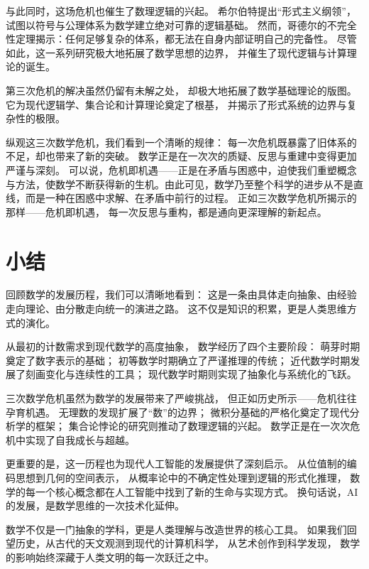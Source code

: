 与此同时，这场危机也催生了数理逻辑的兴起。  
希尔伯特提出“形式主义纲领”，试图以符号与公理体系为数学建立绝对可靠的逻辑基础。  
然而，哥德尔的不完全性定理揭示：任何足够复杂的体系，都无法在自身内部证明自己的完备性。    
尽管如此，这一系列研究极大地拓展了数学思想的边界，  
并催生了现代逻辑与计算理论的诞生。






第三次危机的解决虽然仍留有未解之处，  
却极大地拓展了数学基础理论的版图。  
它为现代逻辑学、集合论和计算理论奠定了根基，  
并揭示了形式系统的边界与复杂性的极限。  







纵观这三次数学危机，我们看到一个清晰的规律：  
每一次危机既暴露了旧体系的不足，却也带来了新的突破。  
数学正是在一次次的质疑、反思与重建中变得更加严谨与深刻。  
可以说，危机即机遇——正是在矛盾与困惑中，迫使我们重塑概念与方法，使数学不断获得新的生机。由此可见，数学乃至整个科学的进步从不是直线，而是一种在困惑中求解、在矛盾中前行的过程。
正如三次数学危机所揭示的那样——危机即机遇，  
每一次反思与重构，都是通向更深理解的新起点。


\section{小结}

回顾数学的发展历程，我们可以清晰地看到：  
这是一条由具体走向抽象、由经验走向理论、由分散走向统一的演进之路。  
这不仅是知识的积累，更是人类思维方式的演化。

从最初的计数需求到现代数学的高度抽象，  
数学经历了四个主要阶段：  
萌芽时期奠定了数字表示的基础；  
初等数学时期确立了严谨推理的传统；  
近代数学时期发展了刻画变化与连续性的工具；  
现代数学时期则实现了抽象化与系统化的飞跃。

三次数学危机虽然为数学的发展带来了严峻挑战，  
但正如历史所示——危机往往孕育机遇。  
无理数的发现扩展了“数”的边界；  
微积分基础的严格化奠定了现代分析学的框架；  
集合论悖论的研究则推动了数理逻辑的兴起。  
数学正是在一次次危机中实现了自我成长与超越。

更重要的是，这一历程也为现代人工智能的发展提供了深刻启示。  
从位值制的编码思想到几何的空间表示，  
从概率论中的不确定性处理到逻辑的形式化推理，  
数学的每一个核心概念都在人工智能中找到了新的生命与实现方式。  
换句话说，AI的发展，是数学思维的一次技术化延伸。

数学不仅是一门抽象的学科，更是人类理解与改造世界的核心工具。  
如果我们回望历史，从古代的天文观测到现代的计算机科学，  
从艺术创作到科学发现，  
数学的影响始终深藏于人类文明的每一次跃迁之中。



